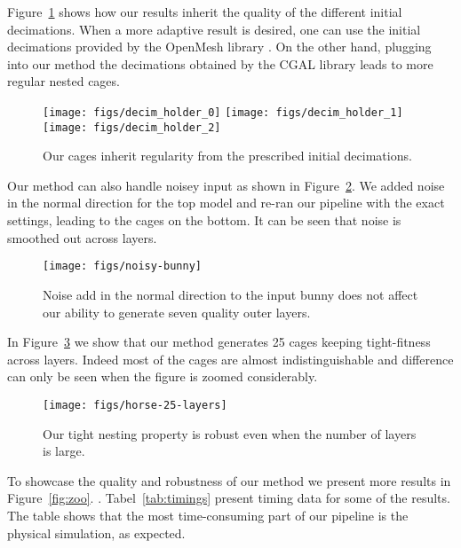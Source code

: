 Figure~\ref{fig:decimations} shows how our results inherit the quality
of the different initial decimations. When a more adaptive result is desired,
one can use the initial decimations provided by the OpenMesh library \cite{openmesh}. 
On the other hand, plugging into our method the decimations obtained by the CGAL
library \cite{cgal} leads to more regular nested cages.

\begin{figure}
  \texttt{[image: figs/decim\_holder\_0]}
    \texttt{[image: figs/decim\_holder\_1]}
      \texttt{[image: figs/decim\_holder\_2]}
  \caption{Our cages inherit regularity from the prescribed initial decimations. 
  }
  \label{fig:decimations}
\end{figure}

Our method can also handle noisey input as shown in Figure~\ref{fig:noisy-bunny}.
We added noise in the normal direction for the top model and 
re-ran our pipeline with the exact settings, leading to the cages on the bottom.
It can be seen that noise is smoothed out across layers. 

\begin{figure}
  \texttt{[image: figs/noisy-bunny]}
  \caption{Noise add in the normal direction to the input bunny does not
  affect our ability to generate seven quality outer layers.}
  \label{fig:noisy-bunny}
\end{figure}

In Figure~\ref{fig:horse-25-layers} we show that our method generates
25 cages keeping tight-fitness across layers. Indeed most of the cages
are almost indistinguishable and difference can only be seen when
the figure is zoomed considerably. 

\begin{figure}
  \texttt{[image: figs/horse-25-layers]}
  \caption{Our tight nesting property is robust even when the number of layers
  is large.}
  \label{fig:horse-25-layers}
\end{figure}

To showcase the quality and robustness of our method we present more results 
in Figure~\ref{fig:zoo}. .
Tabel~\ref{tab:timings} present timing data for some of the results. The table shows
that the most time-consuming part of our pipeline is the physical simulation, as expected.



